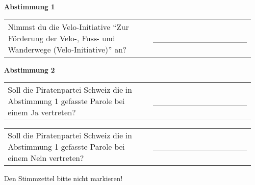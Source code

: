 \documentclass[11pt, a4paper]{scrartcl}
\begin{document}
{\begin{minipage}[t][12.5cm][t]{17.7cm}
\vspace{1cm}

\textbf{Abstimmung 1}

\vspace{0.5cm}

\begin{tabular}{ b{13.5cm} b{3cm} }
Nimmst du die Velo-Initiative \enquote{Zur Förderung der Velo-, Fuss- und Wanderwege (Velo-Initiative)} an?
& \_\_\_\_\_\_\_\_\_\_\_\_\_\_\_\_ \\
\end{tabular}

\vspace{0.5cm}

\textbf{Abstimmung 2}

\vspace{0.5cm}

\begin{tabular}{ b{13.5cm} b{3cm} }
Soll die Piratenpartei Schweiz die in Abstimmung 1 gefasste Parole bei einem Ja vertreten?
& \_\_\_\_\_\_\_\_\_\_\_\_\_\_\_\_ \\
\end{tabular}

\vspace{0.5cm}

\begin{tabular}{ b{13.5cm} b{3cm} }
Soll die Piratenpartei Schweiz die in Abstimmung 1 gefasste Parole bei einem Nein vertreten? 
& \_\_\_\_\_\_\_\_\_\_\_\_\_\_\_\_ \\
\end{tabular}

\vspace{0.5cm}

Den Stimmzettel bitte nicht markieren!

\end{minipage}
}
\end{document}
